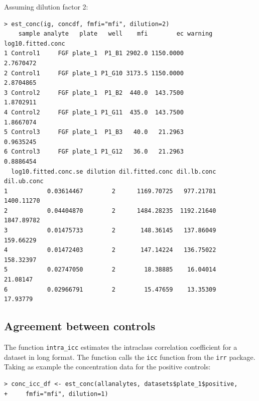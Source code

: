 \documentclass[11pt]{article}\usepackage[]{graphicx}\usepackage[]{color}
\makeatletter
\newenvironment{kframe}{%
 \def\at@end@of@kframe{}%
 \ifinner\ifhmode%
  \def\at@end@of@kframe{\end{minipage}}%
  \begin{minipage}{\columnwidth}%
 \fi\fi%
 \def\FrameCommand##1{\hskip\@totalleftmargin \hskip-\fboxsep
 \colorbox{shadecolor}{##1}\hskip-\fboxsep
     \hskip-\linewidth \hskip-\@totalleftmargin \hskip\columnwidth}%
 \MakeFramed {\advance\hsize-\width
   \@totalleftmargin\z@ \linewidth\hsize
   \@setminipage}}%
 {\par\unskip\endMakeFramed%
 \at@end@of@kframe}
\newenvironment{knitrout}{}{} %
\makeatother
\begin{document}
\noindent Assuming dilution factor 2:
\begin{knitrout}
\color{fgcolor}\begin{kframe}
\begin{verbatim}
> est_conc(ig, concdf, fmfi="mfi", dilution=2)
    sample analyte   plate   well    mfi        ec warning log10.fitted.conc
1 Control1     FGF plate_1  P1_B1 2902.0 1150.0000                 2.7670472
2 Control1     FGF plate_1 P1_G10 3173.5 1150.0000                 2.8704865
3 Control2     FGF plate_1  P1_B2  440.0  143.7500                 1.8702911
4 Control2     FGF plate_1 P1_G11  435.0  143.7500                 1.8667074
5 Control3     FGF plate_1  P1_B3   40.0   21.2963                 0.9635245
6 Control3     FGF plate_1 P1_G12   36.0   21.2963                 0.8886454
  log10.fitted.conc.se dilution dil.fitted.conc dil.lb.conc dil.ub.conc
1           0.03614467        2      1169.70725   977.21781  1400.11270
2           0.04404870        2      1484.28235  1192.21640  1847.89782
3           0.01475733        2       148.36145   137.86049   159.66229
4           0.01472403        2       147.14224   136.75022   158.32397
5           0.02747050        2        18.38885    16.04014    21.08147
6           0.02966791        2        15.47659    13.35309    17.93779
\end{verbatim}
\end{kframe}
\end{knitrout}



\subsection{Agreement between controls}

The function {\tt intra\_icc} estimates the intraclass 
correlation coefficient for a dataset in long format. The function calls the
{\tt icc} function from the {\tt irr} \cite{irr} package.\\

\noindent Taking as example the concentration data for the positive controls:
\begin{knitrout}
\color{fgcolor}\begin{kframe}
\begin{verbatim}
> conc_icc_df <- est_conc(allanalytes, datasets$plate_1$positive, 
+     fmfi="mfi", dilution=1)
\end{verbatim}
\end{kframe}
\end{knitrout}
\end{document}
